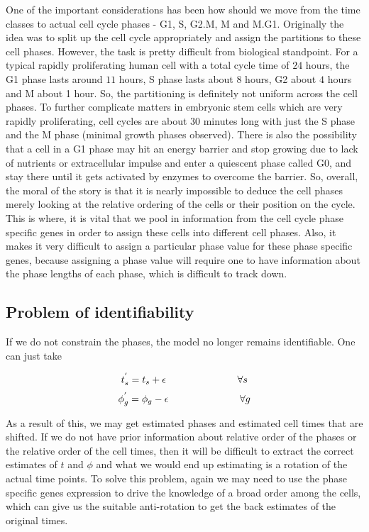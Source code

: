 \documentclass[11pt]{article}
\begin{document}
One of the important considerations has been how should we move from the  time classes to actual  cell cycle phases - G1, S, G2.M, M and M.G1. Originally the idea was to split up the cell cycle appropriately and assign the partitions to these cell phases. However, the task is pretty difficult from biological standpoint. For a typical rapidly proliferating human cell with a total cycle time of $24$ hours, the G1 phase lasts around $11$ hours, S phase lasts about $8$ hours, G2 about $4$ hours and M about 1 hour. So, the partitioning is definitely not uniform across the cell phases. To further complicate matters in embryonic stem cells which are very rapidly proliferating, cell cycles are about 30 minutes long with just the S phase and the M phase (minimal growth phases observed). There is also the possibility that a cell in a G1 phase may hit an energy barrier and stop growing due to lack of nutrients or extracellular impulse and enter a quiescent phase called G0, and stay there until it gets activated by enzymes to overcome the barrier. So, overall, the moral of the story is that it is nearly impossible to deduce the cell phases merely looking at the relative ordering of the cells or their position on the cycle. This is where, it is vital that we pool in information from the cell cycle phase specific genes in order to assign these cells into different cell phases. Also, it makes it very difficult to assign a particular phase value for these phase specific genes, because assigning a phase value will require one to have information about the phase lengths of each phase, which is difficult to track down.

\subsection{Problem of identifiability}

If we do not constrain the phases, the model no longer remains identifiable. One can just take

$$ t^{'}_s = t_{s} + \epsilon \hspace{1 in} \forall s $$
$$ \phi^{'}_{g} = \phi_{g} - \epsilon \hspace{1 in} \forall g $$

As a result of this, we may get estimated phases and estimated cell times that are shifted. If we do not have prior information about relative order of the phases or the relative order of the cell times, then it will be difficult to extract the correct estimates of $t$ and $\phi$ and what we would end up estimating is a rotation of the actual time points. To solve this problem, again we may need to use the phase specific genes expression to drive the knowledge of a broad order among the cells, which can give us the suitable anti-rotation to get the back estimates of the original times.
\end{document}
